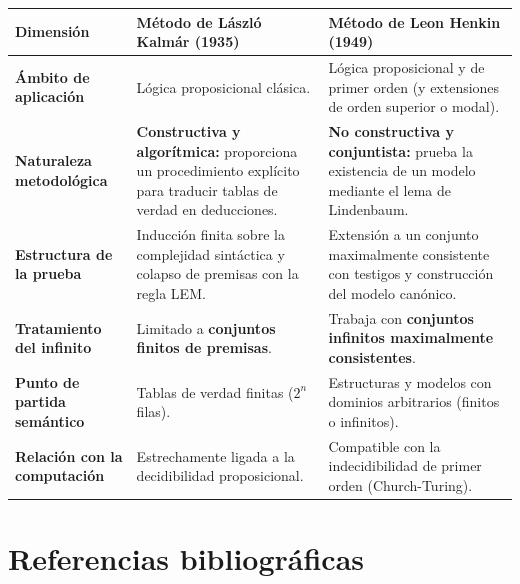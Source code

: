 \begin{center}
\renewcommand{\arraystretch}{1.4}
\begin{tabular}{|>{\raggedright\arraybackslash}p{3.2cm}|>{\raggedright\arraybackslash}p{6cm}|>{\raggedright\arraybackslash}p{6.4cm}|}
\hline
\textbf{Dimensión} & \textbf{Método de László Kalmár (1935)} & \textbf{Método de Leon Henkin (1949)} \\
\hline
\textbf{Ámbito de aplicación} & Lógica proposicional clásica. & Lógica proposicional y de primer orden (y extensiones de orden superior o modal). \\
\hline
\textbf{Naturaleza metodológica} & \textbf{Constructiva y algorítmica:} proporciona un procedimiento explícito para traducir tablas de verdad en deducciones. & \textbf{No constructiva y conjuntista:} prueba la existencia de un modelo mediante el lema de Lindenbaum. \\
\hline
\textbf{Estructura de la prueba} & Inducción finita sobre la complejidad sintáctica y colapso de premisas con la regla LEM. & Extensión a un conjunto maximalmente consistente con testigos y construcción del modelo canónico. \\
\hline
\textbf{Tratamiento del infinito} & Limitado a
                                    \textbf{conjuntos finitos de
                                    premisas}. & Trabaja con
                                                 \textbf{conjuntos
                                                 infinitos maximalmente
                                                 consistentes}. \\
\hline
\textbf{Punto de partida semántico} & Tablas de verdad finitas ($2^n$ filas). & Estructuras y modelos con dominios arbitrarios (finitos o infinitos). \\
\hline
\textbf{Relación con la computación} & Estrechamente ligada a la decidibilidad proposicional. & Compatible con la indecidibilidad de primer orden (Church-Turing). \\
\hline
\end{tabular}
\end{center}


\section*{Referencias bibliográficas}

